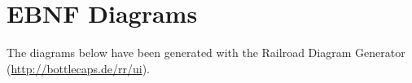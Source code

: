 \section*{EBNF Diagrams}
\label{app:ebnf}
The diagrams below have been generated with the Railroad Diagram Generator (\url{http://bottlecaps.de/rr/ui}).

